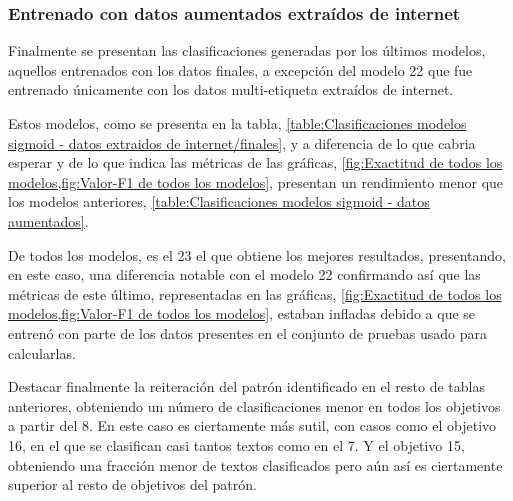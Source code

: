 \subsubsection{Entrenado con datos aumentados extraídos de internet}
Finalmente se presentan las clasificaciones generadas por los últimos modelos,
aquellos entrenados con los datos finales, a excepción del modelo 22 que fue
entrenado únicamente con los datos multi-etiqueta extraídos de internet. 

Estos modelos, como se presenta en la tabla, \cref{table:Clasificaciones modelos
sigmoid - datos extraidos de internet/finales}, y a diferencia de lo que cabria
esperar y de lo que indica las métricas de las gráficas, \cref{fig:Exactitud de
todos los modelos,fig:Valor-F1 de todos los modelos}, presentan un rendimiento
menor que los modelos anteriores, \cref{table:Clasificaciones modelos sigmoid -
datos aumentados}. 

De todos los modelos, es el 23 el que obtiene los mejores resultados,
presentando, en este caso, una diferencia notable con el modelo 22 confirmando
así que las métricas de este último, representadas en las gráficas,
\cref{fig:Exactitud de todos los modelos,fig:Valor-F1 de todos los modelos},
estaban infladas debido a que se entrenó con parte de los datos presentes en el
conjunto de pruebas usado para calcularlas.

Destacar finalmente la reiteración del patrón identificado en el resto de tablas
anteriores, obteniendo un número de clasificaciones menor en todos los objetivos
a partir del 8. En este caso es ciertamente más sutil, con casos como el
objetivo 16, en el que se clasifican casi tantos textos como en el 7. Y el
objetivo 15, obteniendo una fracción menor de textos clasificados pero aún así
es ciertamente superior al resto de objetivos del patrón.

